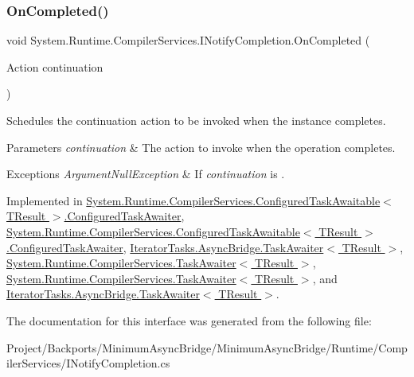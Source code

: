 \subsubsection{\texorpdfstring{On\+Completed()}{OnCompleted()}}
{\footnotesize\ttfamily void System.\+Runtime.\+Compiler\+Services.\+I\+Notify\+Completion.\+On\+Completed (\begin{DoxyParamCaption}\item[{Action}]{continuation }\end{DoxyParamCaption})}



Schedules the continuation action to be invoked when the instance completes.


\begin{DoxyParams}{Parameters}
{\em continuation} & The action to invoke when the operation completes.\\
\hline
\end{DoxyParams}

\begin{DoxyExceptions}{Exceptions}
{\em Argument\+Null\+Exception} & If {\itshape continuation}  is . \\
\hline
\end{DoxyExceptions}


Implemented in \hyperlink{struct_system_1_1_runtime_1_1_compiler_services_1_1_configured_task_awaitable_1_1_configured_task_awaiter_aa2d6d8694d2e2d9a1561e55a70dfd2d7}{System.\+Runtime.\+Compiler\+Services.\+Configured\+Task\+Awaitable$<$ T\+Result $>$.\+Configured\+Task\+Awaiter}, \hyperlink{struct_system_1_1_runtime_1_1_compiler_services_1_1_configured_task_awaitable_1_1_configured_task_awaiter_aa2d6d8694d2e2d9a1561e55a70dfd2d7}{System.\+Runtime.\+Compiler\+Services.\+Configured\+Task\+Awaitable$<$ T\+Result $>$.\+Configured\+Task\+Awaiter}, \hyperlink{struct_iterator_tasks_1_1_async_bridge_1_1_task_awaiter_ab2652fe95760829417ea318260dcde32}{Iterator\+Tasks.\+Async\+Bridge.\+Task\+Awaiter$<$ T\+Result $>$}, \hyperlink{struct_system_1_1_runtime_1_1_compiler_services_1_1_task_awaiter_a13a4416fccdd08a51279a26e93df88da}{System.\+Runtime.\+Compiler\+Services.\+Task\+Awaiter$<$ T\+Result $>$}, \hyperlink{struct_system_1_1_runtime_1_1_compiler_services_1_1_task_awaiter_a13a4416fccdd08a51279a26e93df88da}{System.\+Runtime.\+Compiler\+Services.\+Task\+Awaiter$<$ T\+Result $>$}, and \hyperlink{struct_iterator_tasks_1_1_async_bridge_1_1_task_awaiter_ab2652fe95760829417ea318260dcde32}{Iterator\+Tasks.\+Async\+Bridge.\+Task\+Awaiter$<$ T\+Result $>$}.



The documentation for this interface was generated from the following file\+:\begin{DoxyCompactItemize}
\item 
Project/\+Backports/\+Minimum\+Async\+Bridge/\+Minimum\+Async\+Bridge/\+Runtime/\+Compiler\+Services/I\+Notify\+Completion.\+cs\end{DoxyCompactItemize}
